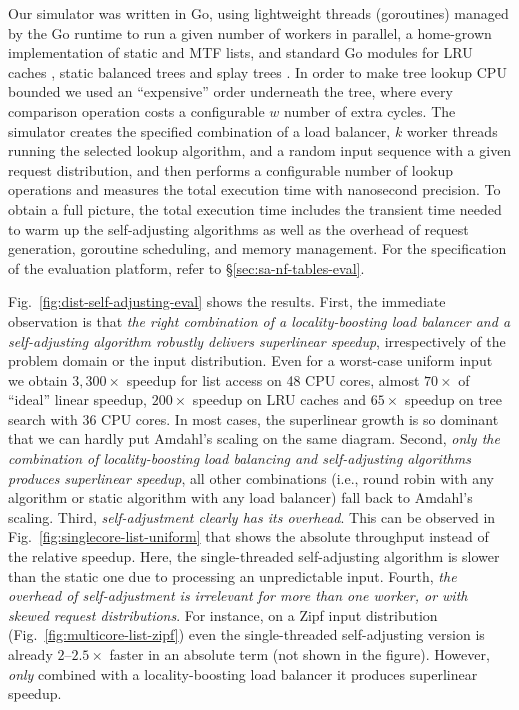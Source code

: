 Our simulator was written in Go, using lightweight threads (goroutines) managed by the Go runtime to run a given number of workers in parallel, a home-grown implementation of static and MTF lists, and standard Go modules for LRU caches \cite{golang-lru}, static balanced trees \cite{golang-btree} and splay trees \cite{golang-splay}. In order to make tree lookup CPU bounded we used an ``expensive'' order underneath the tree, where every comparison operation costs a configurable $w$ number of extra cycles. The simulator creates the specified combination of a load balancer, $k$ worker threads running the selected lookup algorithm, and a random input sequence with a given request distribution, and then performs a configurable number of lookup operations and measures the total execution time with nanosecond precision. To obtain a full picture, the total execution time includes the transient time needed to warm up the self-adjusting algorithms as well as the overhead of request generation, goroutine scheduling, and memory management. For the specification of the evaluation platform, refer to \S\ref{sec:sa-nf-tables-eval}.

Fig.~\ref{fig:dist-self-adjusting-eval} shows the results. First, the immediate observation is that \emph{the right combination of a locality-boosting load balancer and a self-adjusting algorithm robustly delivers superlinear speedup}, irrespectively of the problem domain or the input distribution. Even for a worst-case uniform input we obtain $3,300\times$ speedup for list access on 48 CPU cores, almost $70\times$ of ``ideal'' linear speedup, $200\times$ speedup on LRU caches and $65\times$ speedup on tree search with 36 CPU cores. In most cases, the superlinear growth is so dominant that we can hardly put Amdahl's scaling on the same diagram.  Second, \emph{only the combination of locality-boosting load balancing and self-adjusting algorithms produces superlinear speedup}, all other combinations (i.e., round robin with any algorithm or static algorithm with any load balancer) fall back to Amdahl's scaling.  Third, \emph{self-adjustment clearly has its overhead}. This can be observed in Fig.~\ref{fig:singlecore-list-uniform} that shows the absolute throughput instead of the relative speedup. Here, the single-threaded self-adjusting algorithm is slower than the static one due to processing an unpredictable input. Fourth, \emph{the overhead of self-adjustment is irrelevant for more than one worker, or with skewed request distributions}. For instance, on a Zipf input distribution (Fig.~\ref{fig:multicore-list-zipf}) even the single-threaded self-adjusting version is already $2$--$2.5\times$ faster in an absolute term (not shown in the figure). However, \emph{only} combined with a locality-boosting load balancer it produces superlinear speedup.

